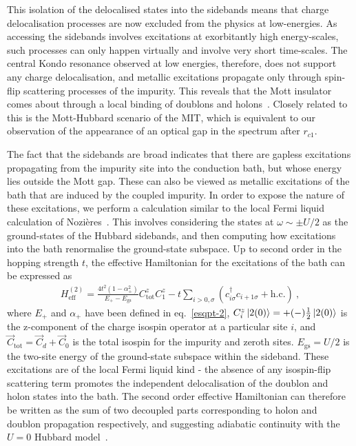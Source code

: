 \documentclass{iopart}
\begin{document}
This isolation of the delocalised states into the sidebands means that charge delocalisation processes are now excluded from the physics at low-energies. As accessing the sidebands involves excitations at exorbitantly high energy-scales, such processes can only happen virtually and involve very short time-scales. The central Kondo resonance observed at low energies, therefore, does not support any charge delocalisation, and metallic excitations propagate only through spin-flip scattering processes of the impurity. This reveals that the Mott insulator comes about through a local binding of doublons and holons~\cite{Mott_1949,kohn1964theory,castellani_1979}. Closely related to this is the Mott-Hubbard scenario of the MIT, which is equivalent to our observation of the appearance of an optical gap in the spectrum after \(r_{c1}\).

The fact that the sidebands are broad indicates that there are gapless excitations propagating from the impurity site into the conduction bath, but whose energy lies outside the Mott gap. These can also be viewed as metallic excitations of the bath that are induced by the coupled impurity. In order to expose the nature of these excitations, we perform a calculation similar to the local Fermi liquid calculation of Nozières~\cite{nozieres1974fermi}. This involves considering the states at \(\omega \sim \pm U/2\) as the ground-states of the Hubbard sidebands, and then computing how excitations into the bath renormalise the ground-state subspace. Up to second order in the hopping strength \(t\), the effective Hamiltonian for the excitations of the bath can be expressed as
\begin{eqnarray}
H_\text{eff}^{(2)} = \frac{4t^2(1 - \alpha_+^2)}{E_+ - E_\text{gs}}C_\text{tot}^z C_1^z - t\sum_{i >0,\sigma}\left(c^\dagger_{i\sigma}c_{i+1\sigma} + \text{h.c.}\right) ~,\label{hodoLFL}
\end{eqnarray}
where \(E_+\) and \(\alpha_+\) have been defined in eq.~\eqref{esqpt-2}, \(C_i^z\ket{2(0)} = +(-)\frac{1}{2}\ket{2(0)}\) is the z-component of the charge isospin operator at a particular site $i$, and \(\vec C_\text{tot} = \vec C_d + \vec C_0\) is the total isospin for the impurity and zeroth sites.
\(E_\text{gs} = U/2\) is the two-site energy of the ground-state subspace within the sideband.
These excitations are of the local Fermi liquid kind - the absence of any isospin-flip scattering term promotes the independent delocalisation of the doublon and holon states into the bath. The second order effective Hamiltonian can therefore be written as the sum of two decoupled parts corresponding to holon and doublon propagation respectively, and suggesting adiabatic continuity with the \(U=0\) Hubbard model~\cite{hrk_1990_prl}. 
\end{document}

